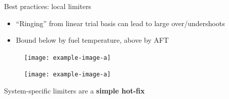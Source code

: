 \documentclass[]{beamer}
\begin{document}
\begin{frame}{Best practices: local limiters}
	\begin{itemize}
		\item ``Ringing'' from linear trial basis can lead to large over/undershoots
		\item Bound below by fuel temperature, above by AFT 
	\end{itemize}
	\begin{figure}
		\centering
		\begin{minipage}{0.4\linewidth}
			\texttt{[image: example-image-a]}
		\end{minipage}
		\begin{minipage}{0.4\linewidth}
			\texttt{[image: example-image-a]}
		\end{minipage}
	\end{figure}
	\begin{tcolorbox}[colframe=blue!50!white,halign=center]
		System-specific limiters are a \textbf{simple hot-fix}
	\end{tcolorbox}
\end{frame}
\end{document}
